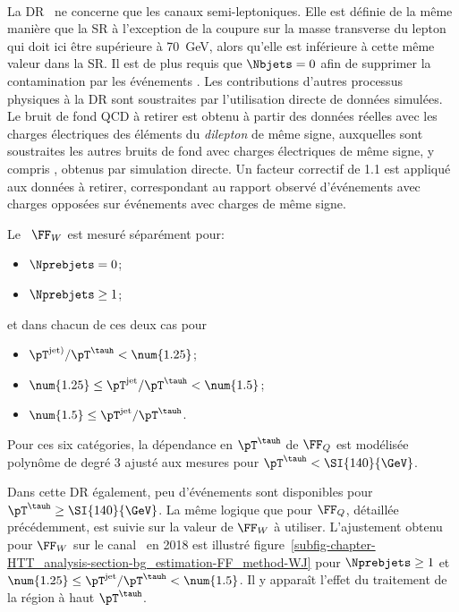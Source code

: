 \paragraph{\Wjets}
La DR \Wjets\ ne concerne que les canaux semi-leptoniques.
Elle est définie de la même manière que la SR à l'exception de la coupure sur la masse transverse du lepton qui doit ici être supérieure à \SI{70}{\GeV}, alors qu'elle est inférieure à cette même valeur dans la SR.
Il est de plus requis que $\Nbjets=0$ afin de supprimer la contamination par les événements \ttbar.
Les contributions d'autres processus physiques à la DR sont soustraites par l'utilisation directe de données simulées.
Le bruit de fond QCD à retirer est obtenu à partir des données réelles avec les charges électriques des éléments du \emph{dilepton} de même signe, auxquelles sont soustraites les autres bruits de fond avec charges électriques de même signe, y compris \Wjets, obtenus par simulation directe.
Un facteur correctif de \num{1.1} est appliqué aux données à retirer, correspondant au rapport observé d'événements avec charges opposées sur événements avec charges de même signe.
\par
Le \fakefactor\ $\FF_W$ est mesuré séparément pour:
\begin{itemize}
\item $\Nprebjets=0$;
\item $\Nprebjets\geq1$;
\end{itemize}
et dans chacun de ces deux cas pour
\begin{itemize}
\item $\pT^{\text{jet})}/\pT^{\tauh} < \num{1.25}$;
\item $\num{1.25} \leq \pT^\text{jet}/\pT^{\tauh} < \num{1.5}$;
\item $\num{1.5} \leq \pT^\text{jet}/\pT^{\tauh}$.
\end{itemize}
Pour ces six catégories, la dépendance en $\pT^{\tauh}$ de $\FF_Q$ est modélisée polynôme de degré 3 ajusté aux mesures pour $\pT^{\tauh}<\SI{140}{\GeV}$.
\par
Dans cette DR également, peu d'événements sont disponibles pour $\pT^{\tauh}\geq\SI{140}{\GeV}$.
La même logique que pour $\FF_Q$, détaillée précédemment, est suivie sur la valeur de $\FF_W$ à utiliser.
L'ajustement obtenu pour $\FF_W$ sur le canal \mu\tauh\ en 2018 est illustré figure~\ref{subfig-chapter-HTT_analysis-section-bg_estimation-FF_method-WJ} pour $\Nprebjets\geq1$ et $\num{1.25} \leq \pT^\text{jet}/\pT^{\tauh} < \num{1.5}$.
Il y apparaît l'effet du traitement de la région à haut $\pT^{\tauh}$.
